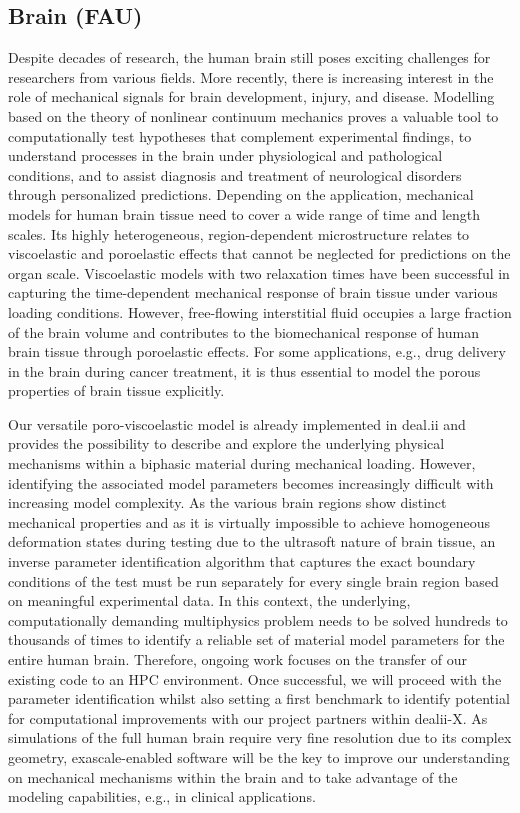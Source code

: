 \documentclass[a4paper,12pt]{article}
\begin{document}
\subsection{Brain (FAU)}
Despite decades of research, the human brain still poses exciting challenges for researchers from various fields.
More recently, there is increasing interest in the role of mechanical signals for brain development, injury, and disease.
Modelling based on the theory of nonlinear continuum mechanics proves a valuable tool to computationally test hypotheses that complement experimental findings, to understand processes in the brain under physiological and pathological conditions, and to assist diagnosis and treatment of neurological disorders through personalized predictions.
Depending on the application, mechanical models for human brain tissue need to cover a wide range of time and length scales.
Its highly heterogeneous, region-dependent microstructure relates to viscoelastic and poroelastic effects that cannot be neglected for predictions on the organ scale.
Viscoelastic models with two relaxation times have been successful in capturing the time-dependent mechanical response of brain tissue under various loading conditions.
However, free-flowing interstitial fluid occupies a large fraction of the brain volume and contributes to the biomechanical response of human brain tissue through poroelastic effects.
For some applications, e.g., drug delivery in the brain during cancer treatment, it is thus essential to model the porous properties of brain tissue explicitly.

Our versatile poro-viscoelastic model is already implemented in deal.ii and provides the possibility to describe and explore the underlying physical mechanisms within a biphasic material during mechanical loading.
However, identifying the associated model parameters becomes increasingly difficult with increasing model complexity.
As the various brain regions show distinct mechanical properties and as it is virtually impossible to achieve homogeneous deformation states during testing due to the ultrasoft nature of brain tissue, an inverse parameter identification algorithm that captures the exact boundary conditions of the test must be run separately for every single brain region based on meaningful experimental data.
In this context, the underlying, computationally demanding multiphysics problem needs to be solved hundreds to thousands of times to identify a reliable set of material model parameters for the entire human brain.
Therefore, ongoing work focuses on the transfer of our existing code to an HPC environment.
Once successful, we will proceed with the parameter identification whilst also setting a first benchmark to identify potential for computational improvements with our project partners within dealii-X.
As simulations of the full human brain require very fine resolution due to its complex geometry, exascale-enabled software will be the key to improve our understanding on mechanical mechanisms within the brain and to take advantage of the modeling capabilities, e.g., in clinical applications.
\end{document}
